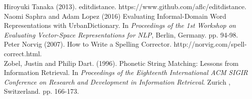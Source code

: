 \documentclass[11pt]{article}
\begin{document}
  Hiroyuki Tanaka (2013). editdistance. https://www.github.com/aflc/editdistance. \\

  Naomi Saphra and Adam Lopez (2016) Evaluating Informal-Domain Word Representations
  with UrbanDictionary. In \textit{Proceedings of the 1st Workshop on Evaluating Vector-Space
  Representations for NLP}, Berlin, Germany. pp. 94-98. \\

  Peter Norvig (2007). How to Write a Spelling Corrector. http://norvig.com/spell-correct.html. \\

  Zobel, Justin and Philip Dart. (1996). Phonetic String Matching: Lessons from
  Information Retrieval. In \textit{Proceedings of the Eighteenth International
  ACM SIGIR Conference on Research and Development in Information Retrieval}. Zurich
  , Switzerland. pp. 166-173. \\
\end{document}
